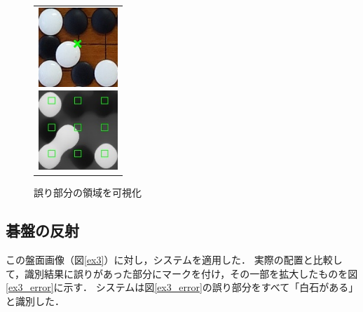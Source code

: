 \documentclass[summary]{nitocs}
\numberwithin{equation}{section}
\begin{document}
            \begin{figure}[tb] %
                \begin{center}
                  \begin{tabular}{c}
                    \begin{minipage}{0.5\hsize}
                      \begin{center}
                        \includegraphics[clip,width=30mm]{DSC_0099/TRIM_resultCompare.jpg}
                    \caption{図\ref{ex2_img}の誤り部分}
                    \label{ex2_error}
                      \end{center}
                    \end{minipage}
                    \begin{minipage}{0.5\hsize}
                      \begin{center}
                        \includegraphics[clip,width=30mm]{DSC_0099/TRIM_boardWithAreaImg.jpg}
                    \caption{誤り部分の領域を可視化}
                    \label{ex2_error_area}
                      \end{center}
                    \end{minipage}
                  \end{tabular}
                \end{center}
            \end{figure}


        \subsection{碁盤の反射} \label{reflection}%
            この盤面画像（図\ref{ex3}）に対し，システムを適用した．
            実際の配置と比較して，識別結果に誤りがあった部分にマークを付け，その一部を拡大したものを図\ref{ex3_error}に示す．
            システムは図\ref{ex3_error}の誤り部分をすべて「白石がある」と識別した．
\end{document}
